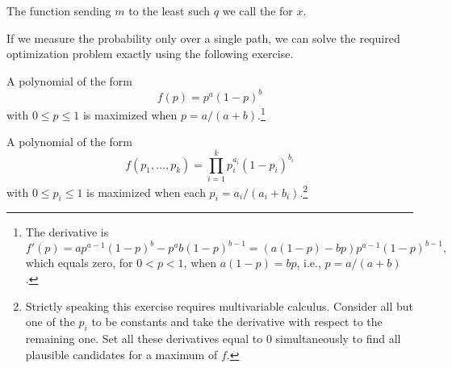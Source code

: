 		The function sending $m$ to the least such $q$ we call the  for $x$.




		If we measure the probability only over a single path, we can solve the required optimization problem exactly using the following exercise.
		\begin{exercise}\label{notMonomial}
			A polynomial of the form
			\[
				f(p)=p^a(1-p)^b
			\]
			with $0\le p\le 1$
			is maximized when $p=a/(a+b)$.\footnote{The derivative is
			\[
				f'(p)=ap^{a-1}(1-p)^b-p^a b (1-p)^{b-1} = (a(1-p)-bp)p^{a-1}(1-p)^{b-1},
			\]
			which equals zero, for $0<p<1$, when $a(1-p)=bp$, i.e., $p=a/(a+b)$.}
		\end{exercise}

		\begin{exercise}
			A polynomial of the form
			\[
				f(p_1,\dots,p_k)=\prod_{i=1}^k p_i^{a_i}(1-p_i)^{b_i}
			\]
			with $0\le p_i\le 1$
			is maximized when each $p_i=a_i/(a_i+b_i)$.\footnote{Strictly speaking this exercise requires multivariable calculus. Consider all but one of the $p_i$ to be constants and take the derivative with respect to the remaining one. Set all these derivatives equal to 0 simultaneously to find all plausible candidates for a maximum of $f$.}
		\end{exercise}






